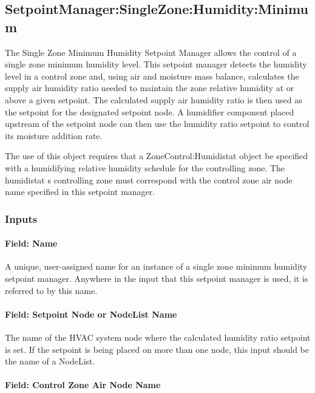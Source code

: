 \subsection{SetpointManager:SingleZone:Humidity:Minimum}\label{setpointmanagersinglezonehumidityminimum}

The Single Zone Minimum Humidity Setpoint Manager allows the control of a single zone minimum humidity level. This setpoint manager detects the humidity level in a control zone and, using air and moisture mass balance, calculates the supply air humidity ratio needed to maintain the zone relative humidity at or above a given setpoint. The calculated supply air humidity ratio is then used as the setpoint for the designated setpoint node. A humidifier component placed upstream of the setpoint node can then use the humidity ratio setpoint to control its moisture addition rate.

The use of this object requires that a ZoneControl:Humidistat object be specified with a humidifying relative humidity schedule for the controlling zone. The humidistat s controlling zone must correspond with the control zone air node name specified in this setpoint manager.

\subsubsection{Inputs}\label{inputs-6-024}

\paragraph{Field: Name}\label{field-name-6-020}

A unique, user-assigned name for an instance of a single zone minimum humidity setpoint manager. Anywhere in the input that this setpoint manager is used, it is referred to by this name.

\paragraph{Field: Setpoint Node or NodeList Name}\label{field-setpoint-node-or-nodelist-name-6}

The name of the HVAC system node where the calculated humidity ratio setpoint is set. If the setpoint is being placed on more than one node, this input should be the name of a NodeList.

\paragraph{Field: Control Zone Air Node Name}\label{field-control-zone-air-node-name}

